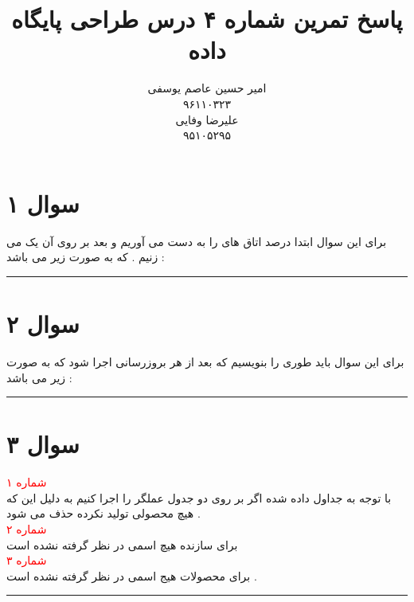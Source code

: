 \documentclass{article}
\title{پاسخ تمرین شماره ۴ درس طراحی پایگاه داده }
\author{
	امیر حسین عاصم یوسفی \\ 
	۹۶۱۱۰۳۲۳\\
	علیرضا وفایی \\ 
	۹۵۱۰۵۲۹۵\\
	}
\begin{document}
	\maketitle
	\section*{سوال ۱}
	برای این سوال ابتدا درصد اتاق های 
را به دست می آوریم و بعد بر روی آن یک 
می زنیم  . که به صورت زیر می باشد : 

\begin{center}
\end{center}
\hrule
\section*{سوال ۲ }
برای این سوال باید طوری 
را بنویسیم که بعد از هر بروزرسانی اجرا شود که به صورت زیر می باشد : 
\begin{flushleft}
\end{flushleft}
\hrule
\section*{سوال ۳}
\textcolor{red}{شماره ۱ }
\\
با توجه به جداول داده شده اگر بر روی دو جدول عملگر 
را اجرا کنیم 
به دلیل این که هیچ محصولی تولید نکرده حذف می شود  . 
\\
\textcolor{red}{شماره ۲  }
\\
برای سازنده 
هیچ اسمی در نظر گرفته نشده است 
\\
\textcolor{red}{شماره ۳}
\\
برای محصولات 
هیج اسمی در نظر گرفته نشده است  . 
\hrule
\end{document}
